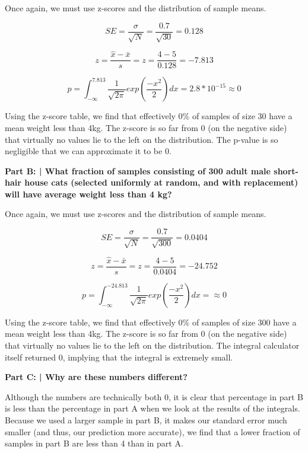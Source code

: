 \documentclass{article}
\begin{document}
 Once again, we must use z-scores and the distribution of sample means.
 
 \[SE=\frac{\sigma}{\sqrt{N}}=\frac{0.7}{\sqrt{30}}=0.128\]
 
 \[z = \frac{\hat{x} - \bar{x}}{s} = z = \frac{4-5}{0.128}=-7.813\]
 
 \[p = \int_{-\infty}^{7.813}\frac{1}{\sqrt{2\pi}}exp(\frac{-x^2}{2})dx = 2.8 * 10^{-15} \approx 0\]
 
 Using the z-score table, we find that effectively $0 \%$ of samples of size 30 have a mean weight less than 4kg. The z-score is so far from 0 (on the negative side) that virtually no values lie to the left on the distribution. The p-value is so negligible that we can approximate it to be 0.
 
 \textbf{Part B: | What fraction of samples consisting of 300 adult male short-hair house cats (selected uniformly at random, and with replacement) will have average weight less than 4 kg?}\newline
 
 Once again, we must use z-scores and the distribution of sample means.
 
 \[SE=\frac{\sigma}{\sqrt{N}}=\frac{0.7}{\sqrt{300}}=0.0404\]
 
 \[z = \frac{\hat{x} - \bar{x}}{s} = z = \frac{4-5}{0.0404}=-24.752\]
 
 \[p = \int_{-\infty}^{-24.813}\frac{1}{\sqrt{2\pi}}exp(\frac{-x^2}{2})dx = \approx 0\]
 
 Using the z-score table, we find that effectively $0 \%$ of samples of size 300 have a mean weight less than 4kg. The z-score is so far from 0 (on the negative side) that virtually no values lie to the left on the distribution. The integral calculator itself returned 0, implying that the integral is extremely small.
 
 \textbf{Part C: | Why are these numbers different?}\newline
 
 Although the numbers are technically both 0, it is clear that percentage in part B is less than the percentage in part A when we look at the results of the integrals. Because we used a larger sample in part B, it makes our standard error much smaller (and thus, our prediction more accurate), we find that a lower fraction of samples in part B are less than 4 than in part A. 
 
 \newpage
 
 \noindent\makebox[\linewidth]{\rule{\paperwidth}{0.4pt}}\newline
 
\end{document}
